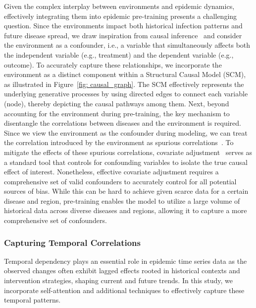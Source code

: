 Given the complex interplay between environments and epidemic dynamics, effectively integrating them into epidemic pre-training presents a challenging question. Since the environments impact both historical infection patterns and future disease spread, we draw inspiration from causal inference~\cite{zhou2023causal, jiao2024causal} and consider the environment as a confounder, i.e., a variable that simultaneously affects both the independent variable (e.g., treatment) and the dependent variable (e.g., outcome). To accurately capture these relationships, we incorporate the environment as a distinct component within a Structural Causal Model (SCM), as illustrated in Figure~\ref{fig: causal_graph}. The SCM effectively represents the underlying generative processes by using directed edges to connect each variable (node), thereby depicting the causal pathways among them.
Next, beyond accounting for the environment during pre-training, the key mechanism to disentangle the correlations between diseases and the environment is required. Since we view the environment as the confounder during modeling, we can treat the correlation introduced by the environment as spurious correlations~\cite{ming2022impact}. To mitigate the effects of these spurious correlations, covariate adjustment~\cite{runge2023causal} serves as a standard tool that controls for confounding variables to isolate the true causal effect of interest. Nonetheless, effective covariate adjustment requires a comprehensive set of valid confounders to accurately control for all potential sources of bias. While this can be hard to achieve given scarce data for a certain disease and region, pre-training enables the model to utilize a large volume of historical data across diverse diseases and regions, allowing it to capture a more comprehensive set of confounders.


\subsubsection{Capturing Temporal Correlations}
\label{sec: temporal_corr}
Temporal dependency plays an essential role in epidemic time series data as the observed changes often exhibit lagged effects rooted in historical contexts and intervention strategies, shaping current and future trends. In this study, we incorporate self-attention and additional techniques to effectively capture these temporal patterns.

